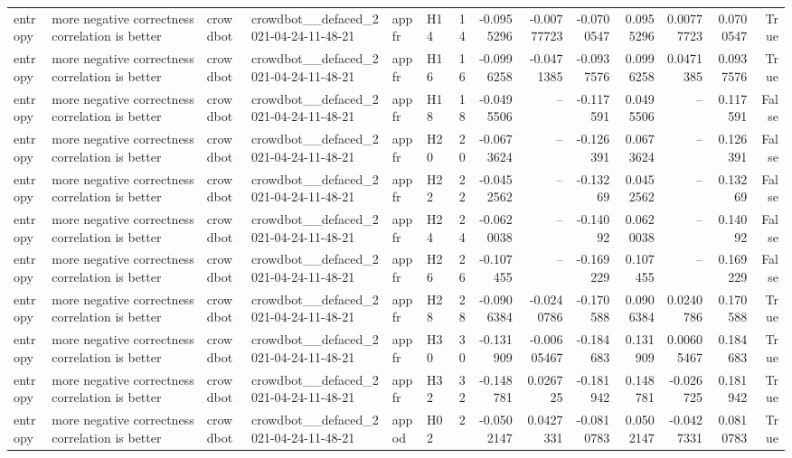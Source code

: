 \begin{longtable}{llllllrrrrrrrr}
entropy & more negative correctness correlation is better & crowdbot & crowdbot\_\_defaced\_2021-04-24-11-48-21 & appfr & H14 & 14 & -0.0955296 & -0.00777723 & -0.0700547 & 0.0955296 & 0.00777723 & 0.0700547 & True \\
entropy & more negative correctness correlation is better & crowdbot & crowdbot\_\_defaced\_2021-04-24-11-48-21 & appfr & H16 & 16 & -0.0996258 & -0.0471385 & -0.0937576 & 0.0996258 & 0.0471385 & 0.0937576 & True \\
entropy & more negative correctness correlation is better & crowdbot & crowdbot\_\_defaced\_2021-04-24-11-48-21 & appfr & H18 & 18 & -0.0495506 & -- & -0.117591 & 0.0495506 & -- & 0.117591 & False \\
entropy & more negative correctness correlation is better & crowdbot & crowdbot\_\_defaced\_2021-04-24-11-48-21 & appfr & H20 & 20 & -0.0673624 & -- & -0.126391 & 0.0673624 & -- & 0.126391 & False \\
entropy & more negative correctness correlation is better & crowdbot & crowdbot\_\_defaced\_2021-04-24-11-48-21 & appfr & H22 & 22 & -0.0452562 & -- & -0.13269 & 0.0452562 & -- & 0.13269 & False \\
entropy & more negative correctness correlation is better & crowdbot & crowdbot\_\_defaced\_2021-04-24-11-48-21 & appfr & H24 & 24 & -0.0620038 & -- & -0.14092 & 0.0620038 & -- & 0.14092 & False \\
entropy & more negative correctness correlation is better & crowdbot & crowdbot\_\_defaced\_2021-04-24-11-48-21 & appfr & H26 & 26 & -0.107455 & -- & -0.169229 & 0.107455 & -- & 0.169229 & False \\
entropy & more negative correctness correlation is better & crowdbot & crowdbot\_\_defaced\_2021-04-24-11-48-21 & appfr & H28 & 28 & -0.0906384 & -0.0240786 & -0.170588 & 0.0906384 & 0.0240786 & 0.170588 & True \\
entropy & more negative correctness correlation is better & crowdbot & crowdbot\_\_defaced\_2021-04-24-11-48-21 & appfr & H30 & 30 & -0.131909 & -0.00605467 & -0.184683 & 0.131909 & 0.00605467 & 0.184683 & True \\
entropy & more negative correctness correlation is better & crowdbot & crowdbot\_\_defaced\_2021-04-24-11-48-21 & appfr & H32 & 32 & -0.148781 & 0.026725 & -0.181942 & 0.148781 & -0.026725 & 0.181942 & True \\
entropy & more negative correctness correlation is better & crowdbot & crowdbot\_\_defaced\_2021-04-24-11-48-21 & appod & H02 & 2 & -0.0502147 & 0.0427331 & -0.0810783 & 0.0502147 & -0.0427331 & 0.0810783 & True \\

\end{longtable}
